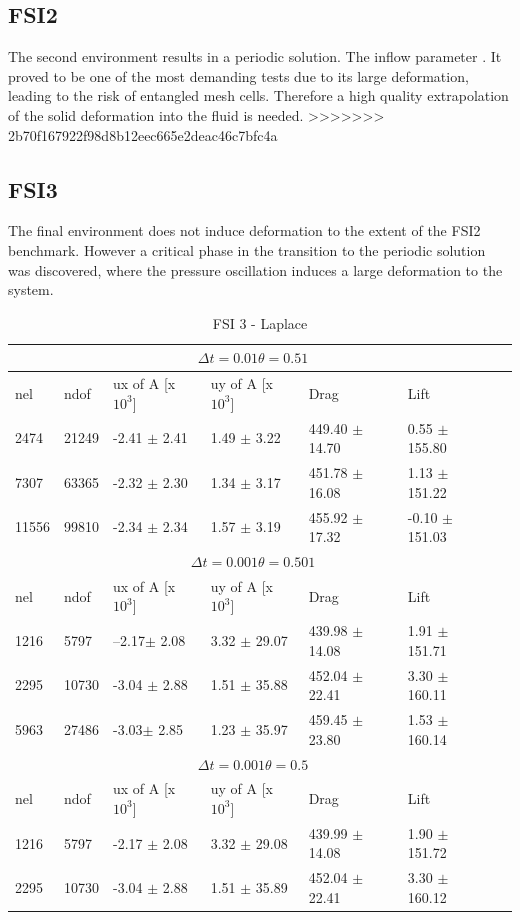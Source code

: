 \subsection{FSI2}
The second environment results in a periodic solution. The inflow parameter .
It proved to be one of the most demanding tests due to its large deformation, leading to the risk of entangled mesh cells. Therefore a high quality extrapolation of the solid deformation into the fluid is needed. 
>>>>>>> 2b70f167922f98d8b12eec665e2deac46c7bfc4a
\\
\subsection{FSI3}
The final environment does not induce deformation to the extent of the FSI2 benchmark. However a critical phase in the transition to the periodic solution was discovered, where the pressure oscillation induces a large deformation to the system.
\begin{table}[h!]
\centering
\caption{FSI 3 - Laplace}
\label{my-label}
\begin{tabular}{ |p{1cm}||p{1cm}|p{2.5cm}|p{2.5cm}|p{2.7cm}|p{2.7cm}|p{1.2cm}|}
 \hline
  \multicolumn{6}{|c|}{$\Delta t = 0.01 \theta = 0.51$} \\
   \hline
nel & ndof & ux of A [x $10^{3}$]  &uy of A [x $10^{3}$]& Drag  & Lift \\
 \hline
 2474    & 21249  & -2.41      $\pm$ 2.41 & 1.49       $\pm$ 3.22 & 449.40       $\pm$ 14.70 & 0.55       $\pm$ 155.80  \\
 7307    & 63365  & -2.32       $\pm$ 2.30 & 1.34       $\pm$ 3.17 & 451.78       $\pm$ 16.08 & 1.13       $\pm$ 151.22  \\
 11556   & 99810  & -2.34       $\pm$ 2.34 & 1.57       $\pm$ 3.19 & 455.92       $\pm$ 17.32 & -0.10       $\pm$ 151.03 \\
 \hline
  \multicolumn{6}{|c|}{$\Delta t = 0.001 \theta = 0.501$} \\
   \hline
 nel & ndof & ux of A [x $10^{3}$]  &uy of A [x $10^{3}$]& Drag  & Lift \\
1216 &5797& --2.17$\pm$  2.08 &     3.32     $\pm$  29.07 &439.98 $\pm$  14.08  &  1.91 $\pm$  151.71\\
2295 &10730& -3.04 $\pm$  2.88 &  1.51  $\pm$  35.88 & 452.04  $\pm$  22.41 &  3.30      $\pm$  160.11 \\
5963 &27486 & -3.03$\pm$  2.85 &  1.23 $\pm$  35.97  & 459.45  $\pm$  23.80 &  1.53  $\pm$  160.14 \\
\hline
\multicolumn{6}{|c|}{$\Delta t = 0.001 \theta = 0.5$} \\
   \hline
 nel & ndof & ux of A [x $10^{3}$]  &uy of A [x $10^{3}$]& Drag  & Lift \\
\hline
1216 &5797& -2.17  $\pm$   2.08 &  3.32 $\pm$   29.08  & 439.99  $\pm$   14.08  & 1.90 $\pm$  151.72 \\
2295 &10730& -3.04 $\pm$  2.88  & 1.51  $\pm$  35.89  & 452.04   $\pm$  22.41 &  3.30 $\pm$  160.12 \\
\hline
\end{tabular}
\end{table}


